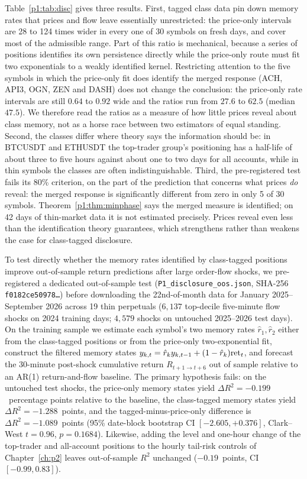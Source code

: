 Table~\ref{p1:tab:disc} gives three results. First, tagged class data pin down memory rates that prices and flow leave essentially unrestricted: the price-only intervals are 28 to 124 times wider in every one of 30 symbols on fresh days, and cover most of the admissible range. Part of this ratio is mechanical, because a series of positions identifies its own persistence directly while the price-only route must fit two exponentials to a weakly identified kernel. Restricting attention to the five symbols in which the price-only fit does identify the merged response (ACH, API3, OGN, ZEN and DASH) does not change the conclusion: the price-only rate intervals are still $0.64$ to $0.92$ wide and the ratios run from $27.6$ to $62.5$ (median $47.5$). We therefore read the ratios as a measure of how little prices reveal about class memory, not as a horse race between two estimators of equal standing. Second, the classes differ where theory says the information should be: in BTCUSDT and ETHUSDT the top-trader group's positioning has a half-life of about three to five hours against about one to two days for all accounts, while in thin symbols the classes are often indistinguishable. Third, the pre-registered test fails its 80\% criterion, on the part of the prediction that concerns what prices \emph{do} reveal: the merged response is significantly different from zero in only 5 of 30 symbols. Theorem~\ref{p1:thm:minphase} says the merged measure is identified; on 42 days of thin-market data it is not estimated precisely. Prices reveal even less than the identification theory guarantees, which strengthens rather than weakens the case for class-tagged disclosure.

To test directly whether the memory rates identified by class-tagged positions improve out-of-sample return predictions after large order-flow shocks, we pre-registered a dedicated out-of-sample test (\texttt{P1\_disclosure\_oos.json}, SHA-256 \texttt{f0182ce50978\ldots}) before downloading the 22nd-of-month data for January 2025--September 2026 across 19 thin perpetuals ($6{,}137$ top-decile five-minute flow shocks on 2024 training days; $4{,}579$ shocks on untouched 2025--2026 test days). On the training sample we estimate each symbol's two memory rates $\hat r_1,\hat r_2$ either from the class-tagged positions or from the price-only two-exponential fit, construct the filtered memory states $y_{k,t}=\hat r_k y_{k,t-1}+(1-\hat r_k){\rm ret}_t$, and forecast the 30-minute post-shock cumulative return $R_{t+1\to t+6}$ out of sample relative to an AR(1) return-and-flow baseline. The primary hypothesis fails: on the untouched test shocks, the price-only memory states yield $\Delta R^2=-0.199$~percentage points relative to the baseline, the class-tagged memory states yield $\Delta R^2=-1.288$~points, and the tagged-minus-price-only difference is $\Delta R^2=-1.089$~points (95\% date-block bootstrap CI $[-2.605,+0.376]$, Clark--West $t=0.96$, $p=0.1684$). Likewise, adding the level and one-hour change of the top-trader and all-account positions to the hourly tail-risk controls of Chapter~\ref{ch:p2} leaves out-of-sample $R^2$ unchanged ($-0.19$~points, CI $[-0.99,0.83]$).

